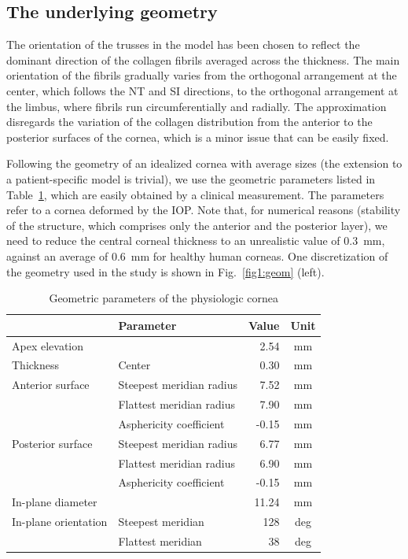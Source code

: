 \documentclass[preprint,12pt]{elsarticle}
\begin{document}
\subsection{The underlying geometry}
\label{ssec:underlyingGeometry}

The orientation of the trusses in the model has been chosen to reflect the dominant direction of the collagen fibrils averaged across the thickness. The main orientation of the fibrils gradually varies from the orthogonal arrangement at the center, which follows the NT and SI directions, to the orthogonal arrangement at the limbus, where fibrils run circumferentially and radially. The approximation disregards the variation of the collagen distribution from the anterior to the posterior surfaces of the cornea, which is a minor issue that can be easily fixed.

Following the geometry of an idealized cornea with average sizes (the extension to a patient-specific model is trivial), we use the geometric parameters listed in Table~\ref{table:geometry}, which are easily obtained by a clinical measurement. The parameters refer to a cornea deformed by the IOP. Note that, for numerical reasons (stability of the structure, which comprises only the anterior and the posterior layer), we need to reduce the central corneal thickness to an unrealistic value of 0.3~mm, against an average of 0.6~mm for healthy human corneas. One discretization of the geometry used in the study is shown in Fig.~\ref{fig1:geom} (left).

\begin{table}[]
    \centering
    \begin{tabular}{llrc}
                           & Parameter                &  Value    &  Unit \\
         \hline \hline
         Apex elevation    &                           & 2.54  & mm \\
         Thickness         & Center                    & 0.30  & mm \\
         Anterior surface  & Steepest meridian radius  & 7.52  &  mm\\
                           & Flattest meridian radius  & 7.90  &  mm\\
                           & Asphericity coefficient   & -0.15 &  mm\\
         Posterior surface & Steepest meridian radius  & 6.77  &  mm\\
                           & Flattest meridian radius  & 6.90  &  mm\\
                           & Asphericity coefficient   & -0.15 &  mm\\
         In-plane diameter &                           & 11.24 &  mm \\
         In-plane orientation & Steepest meridian      & 128   &  deg \\
                              & Flattest meridian      & 38   &  deg \\
         \hline
    \end{tabular}
    \caption{Geometric parameters of the physiologic cornea}
    \label{table:geometry}
\end{table}
\end{document}
